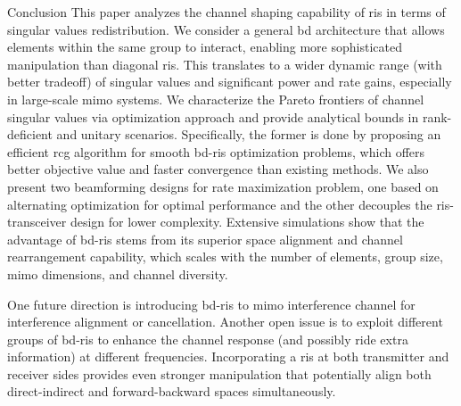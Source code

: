 \documentclass[journal]{IEEEtran}
\begin{document}
\begin{section}{Conclusion}
	This paper analyzes the channel shaping capability of \gls{ris} in terms of singular values redistribution.
	We consider a general \gls{bd} architecture that allows elements within the same group to interact, enabling more sophisticated manipulation than diagonal \gls{ris}.
	This translates to a wider dynamic range (with better tradeoff) of singular values and significant power and rate gains, especially in large-scale \gls{mimo} systems.
	We characterize the Pareto frontiers of channel singular values via optimization approach and provide analytical bounds in rank-deficient and unitary scenarios.
	Specifically, the former is done by proposing an efficient \gls{rcg} algorithm for smooth \gls{bd}-\gls{ris} optimization problems, which offers better objective value and faster convergence than existing methods.
	We also present two beamforming designs for rate maximization problem, one based on alternating optimization for optimal performance and the other decouples the \gls{ris}-transceiver design for lower complexity.
	Extensive simulations show that the advantage of \gls{bd}-\gls{ris} stems from its superior space alignment and channel rearrangement capability, which scales with the number of elements, group size, \gls{mimo} dimensions, and channel diversity.

	One future direction is introducing \gls{bd}-\gls{ris} to \gls{mimo} interference channel for interference alignment or cancellation.
	Another open issue is to exploit different groups of \gls{bd}-\gls{ris} to enhance the channel response (and possibly ride extra information) at different frequencies.
	Incorporating a \gls{ris} at both transmitter and receiver sides provides even stronger manipulation that potentially align both direct-indirect and forward-backward spaces simultaneously.
\end{section}

\end{document}
